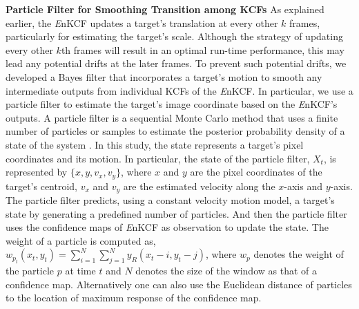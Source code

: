 \documentclass[10pt,twocolumn,letterpaper]{article}
\begin{document}
\textbf{Particle Filter for Smoothing Transition among KCFs} As
explained earlier, the {\it E}nKCF updates a target's translation at
every other $k$ frames, particularly for estimating the target's
scale. Although the strategy of updating every other $k$th frames will
result in an optimal run-time performance, this may lead any potential
drifts at the later frames. To prevent such potential drifts, we
developed a Bayes filter that incorporates a target's motion to smooth
any intermediate outputs from individual KCFs of the {\it E}nKCF. In
particular, we use a particle filter to estimate the target's image
coordinate based on the {\it E}nKCF's outputs. A particle filter is a
sequential Monte Carlo method that uses a finite number of particles
or samples to estimate the posterior probability density of a state of
the system \cite{thrun2005probabilistic}. In this study, the state
represents a target's pixel coordinates and its motion. In particular,
the state of the particle filter, $X_t$, is represented by $\lbrace x,
y, v_{x}, v_{y} \rbrace$, where $x$ and $y$ are the pixel coordinates
of the target's centroid, $v_x$ and $v_y$ are the estimated velocity
along the $x$-axis and $y$-axis. The particle filter predicts, using a
constant velocity motion model, a target's state by generating a
predefined number of particles. And then the particle filter uses the
confidence maps of {\it E}nKCF as observation to update the state. The
weight of a particle is computed as, $w_{p_{t}}(x_{t},y_{t}) =
\sum_{i=1}^{N}\sum_{j=1}^{N} y_{R}(x_{t}-i,y_{t}-j)$, where $w_{p}$
denotes the weight of the particle $p$ at time $t$ and $N$ denotes the
size of the window as that of a confidence map. Alternatively one can
also use the Euclidean distance of particles to the location of
maximum response of the confidence map.

\end{document}
